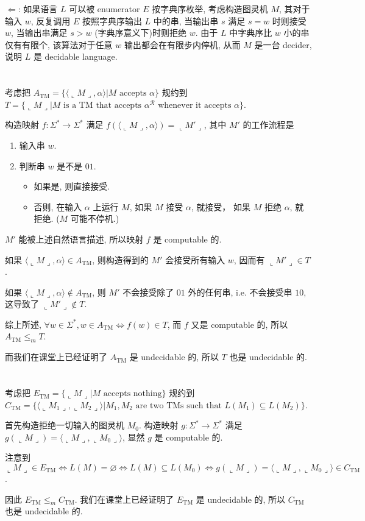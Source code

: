 \documentclass[8pt]{article}
\theoremstyle{compact}
\def\le{\leqslant}
\def\rep#1{\llcorner{#1}\lrcorner}
\begin{document}
$\Leftarrow$: 如果语言 $L$ 可以被 enumerator $E$ 按字典序枚举, 考虑构造图灵机 $M$, 其对于输入 $w$, 反复调用 $E$ 按照字典序输出 $L$ 中的串, 当输出串 $s$ 满足 $s = w$ 时则接受$w$, 当输出串满足 $s > w$ (字典序意义下)时则拒绝 $w$. 由于 $L$ 中字典序比 $w$ 小的串仅有有限个, 该算法对于任意 $w$ 输出都会在有限步内停机, 从而 $M$ 是一台 decider, 说明 $L$ 是 decidable language.

\section{}

考虑把 $A_{\text{TM}} = \{\langle \rep M, \alpha \rangle | M \text{ accepts } \alpha\}$ 规约到 $T = \{\rep{M} | M \text{ is a TM that accepts } {\alpha}^{\mathcal R} \text{ whenever it accepts }\alpha\}$.

构造映射 $f: \Sigma^* \to \Sigma^*$ 满足 $f(\langle \rep M, \alpha \rangle) = \rep{M'}$, 其中 $M'$ 的工作流程是
\begin{enumerate}
	\item 输入串 $w$.
	\item 判断串 $w$ 是不是 $01$.
	\begin{itemize}
		\item 如果是, 则直接接受.
		\item 否则, 在输入 $\alpha$ 上运行 $M$, 如果 $M$ 接受 $\alpha$, 就接受， 如果 $M$ 拒绝 $\alpha$, 就拒绝. ($M$ 可能不停机.)
	\end{itemize}
\end{enumerate}

$M'$ 能被上述自然语言描述, 所以映射 $f$ 是 computable 的.

如果 $\langle \rep M, \alpha \rangle \in A_{\text{TM}}$, 则构造得到的 $M'$ 会接受所有输入 $w$, 因而有 $\rep{M'} \in T$.

如果 $\langle \rep M, \alpha \rangle \notin A_{\text{TM}}$, 则 $M'$ 不会接受除了 $01$ 外的任何串, i.e. 不会接受串 $10$, 这导致了 $\rep{M'} \notin T$.

综上所述, $\forall w \in \Sigma^*, w \in A_{\text{TM}} \Leftrightarrow f(w) \in T$, 而 $f$ 又是 computable 的, 所以 $A_{\text{TM}} \le_m T$.

而我们在课堂上已经证明了 $A_{\text{TM}}$ 是 undecidable 的, 所以 $T$ 也是 undecidable 的.

\section{}

考虑把 $E_{\text{TM}} = \{\rep M | M \text{ accepts nothing} \}$ 规约到 $C_{\text{TM}} = \{\langle \rep{M_1}, \rep{M_2}\rangle | M_1, M_2 \text{ are two TMs such that } L(M_1) \subseteq L(M_2)\}$.

首先构造拒绝一切输入的图灵机 $M_0$. 构造映射 $g: \Sigma^* \to \Sigma^*$ 满足 $g(\rep{M}) = \langle \rep{M}, \rep{M_0}\rangle$, 显然 $g$ 是 computable 的.

注意到 $\rep{M} \in E_{\text{TM}} \Leftrightarrow L(M) = \varnothing \Leftrightarrow L(M) \subseteq L(M_0) \Leftrightarrow g(\rep{M}) = \langle \rep{M}, \rep{M_0}\rangle \in C_{\text{TM}}$.

因此 $E_{\text{TM}} \le_m C_{\text{TM}}$. 我们在课堂上已经证明了 $E_{\text{TM}}$ 是 undecidable 的, 所以 $C_{\text{TM}}$ 也是 undecidable 的.
\end{document}
